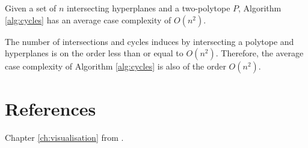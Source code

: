\begin{proposition}\label{prop:complexity_splinecam}
    Given a set of $n$ intersecting hyperplanes and a two-polytope $P$, Algorithm \ref{alg:cycles} has an average case complexity of $O\left(n^2\right)$.
\end{proposition}

\begin{tproof}
    The number of intersections and cycles induces by intersecting a polytope and hyperplanes is on the order less than or equal to $O\left(n^2\right)$. Therefore, the average case complexity of Algorithm \ref{alg:cycles} is also of the order $O\left(n^2\right)$.
\end{tproof}

\section{References}

Chapter \ref{ch:visualisation} from \cite{humayunSplineCamExactVisualization2023}.